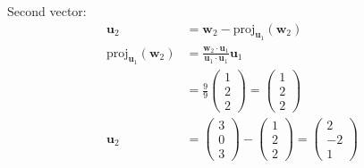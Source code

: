 \documentclass[11pt]{exam}
\begin{document}
\begin{questions}
\begin{parts}
Second vector:
\begin{align*}
\mathbf{u}_2 &= \mathbf{w}_2 - \text{proj}_{\mathbf{u}_1}(\mathbf{w}_2) \\
\text{proj}_{\mathbf{u}_1}(\mathbf{w}_2) &= \frac{\mathbf{w}_2 \cdot \mathbf{u}_1}{\mathbf{u}_1 \cdot \mathbf{u}_1}\mathbf{u}_1 \\
&= \frac{9}{9}\begin{pmatrix} 1 \\ 2 \\ 2 \end{pmatrix} = \begin{pmatrix} 1 \\ 2 \\ 2 \end{pmatrix} \\
\mathbf{u}_2 &= \begin{pmatrix} 3 \\ 0 \\ 3 \end{pmatrix} - \begin{pmatrix} 1 \\ 2 \\ 2 \end{pmatrix} = \begin{pmatrix} 2 \\ -2 \\ 1 \end{pmatrix}
\end{align*}


\end{parts}
\end{questions}
\end{document}
